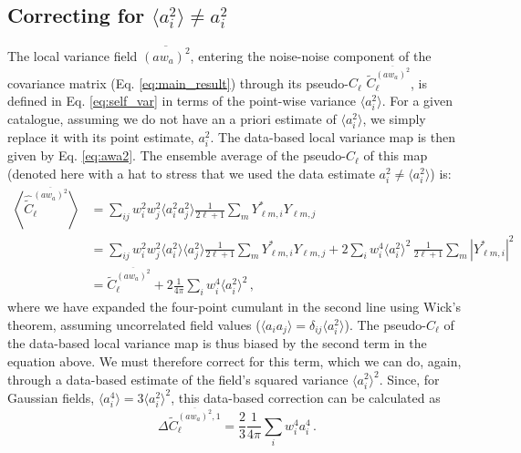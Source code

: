 \documentclass[%
 reprint,
superscriptaddress,
nofootinbib,
 amsmath,amssymb,
 aps,
 prd,
]{revtex4-2}
\begin{document}
  \subsection{Correcting for \texorpdfstring{$\langle a_i^2\rangle\neq a_i^2$}{data-based point correlation estimates}}
    The local variance field $\overline{(aw_a)^2}$, entering the noise-noise component of the covariance matrix (Eq. \ref{eq:main_result}) through its pseudo-$C_\ell$ $\tilde{C}_\ell^{\overline{(aw_a)^2}}$, is defined in  Eq. \ref{eq:self_var} in terms of the point-wise variance $\langle a_i^2\rangle$. For a given catalogue, assuming we do not have an a priori estimate of $\langle a_i^2\rangle$, we simply replace it with its point estimate, $a_i^2$. The data-based local variance map is then given by Eq. \ref{eq:awa2}. The ensemble average of the pseudo-$C_\ell$ of this map (denoted here with a hat to stress that we used the data estimate $a_i^2\neq\langle a_i^2\rangle$) is:
    \begin{align}\nonumber
      \left\langle\hat{\tilde{C}}^{\overline{(aw_a)^2}}_\ell\right\rangle
      &= \sum_{ij}w_i^2w_j^2\langle a_i^2a_j^2\rangle \frac{1}{2\ell+1}\sum_mY^*_{\ell m,i}Y_{\ell m,j}\\\nonumber
      &= \sum_{ij}w_i^2w_j^2\langle a_i^2\rangle\langle a_j^2\rangle \frac{1}{2\ell+1}\sum_mY^*_{\ell m,i}Y_{\ell m,j}+2\sum_iw_i^4\langle a_i^2\rangle^2\,\frac{1}{2\ell+1}\sum_m|Y^*_{\ell m,i}|^2\\\label{eq:pcl_var_corr1}
      &=\tilde{C}^{\overline{(aw_a)^2}}_\ell+2\frac{1}{4\pi}\sum_iw_i^4\langle a_i^2\rangle^2 \, ,
    \end{align}
    where we have expanded the four-point cumulant in the second line using Wick's theorem, assuming uncorrelated field values ($\langle a_ia_j\rangle=\delta_{ij}\langle a_i^2\rangle$). The pseudo-$C_\ell$ of the data-based local variance map is thus biased by the second term in the equation above. We must therefore correct for this term, which we can do, again, through a data-based estimate of the field's squared variance $\langle a^2_i\rangle^2$. Since, for Gaussian fields, $\langle a_i^4\rangle=3\langle a_i^2\rangle^2$, this data-based correction can be calculated as
    \begin{equation}
      \Delta\tilde{C}^{\overline{(aw_a)^2},1}_\ell=\frac{2}{3}\frac{1}{4\pi}\sum_iw_i^4a_i^4 \, .
    \end{equation}
\end{document}
